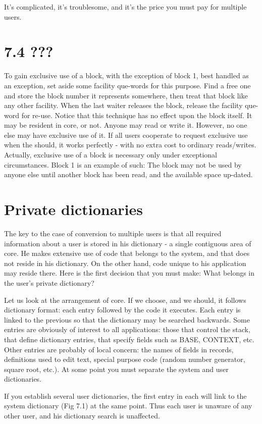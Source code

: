 \documentclass[b5paper, oneside]{book}
\begin{document}
It's complicated, it's troublesome, and it's the price you must pay for multiple users.

\section{7.4 ???}
To gain exclusive use of a block, with the exception of block 1, best handled as an exception, set aside some facility que-words for this purpose. Find a free one and store the block number it represents somewhere, then treat that block like any other facility. When the last waiter releases the block, release the facility que-word for re-use. Notice that this technique has no effect upon the block itself. It may be resident in core, or not. Anyone may read or write it. However, no one else may have exclusive use of it. If all users cooperate to request exclusive use when the should, it works perfectly - with no extra cost to ordinary reads/writes. Actually, exclusive use of a block is necessary only under exceptional circumstances. Block 1 is an example of such: The block may not be used by anyone else until another block has been read, and the available space up-dated.

\section{Private dictionaries}
The key to the case of conversion to multiple users is that all required information about a user is stored in his dictionary - a single contiguous area of core. He makes extensive use of code that belongs to the system, and that does not reside in his dictionary. On the other hand, code unique to his application may reside there. Here is the first decision that you must make: What belongs in the user's private dictionary?

Let us look at the arrangement of core. If we choose, and we should, it follows dictionary format: each entry followed by the code it executes. Each entry is linked to the previous so that the dictionary may be searched backwards. Some entries are obviously of interest to all applications: those that control the stack, that define dictionary entries, that specify fields such as BASE, CONTEXT, etc. Other entries are probably of local concern: the names of fields in records, definitions used to edit text, special purpose code (random number generator, square root, etc.). At some point you must separate the system and user dictionaries.

If you establish several user dictionaries, the first entry in each will link to the system dictionary (Fig 7.1) at the same point. Thus each user is unaware of any other user, and his dictionary search is unaffected.
\end{document}
